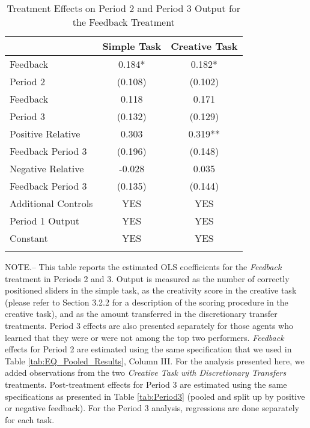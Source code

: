 \begin{table}[h]%
\captionsetup{justification=centering}
\setlength\tabcolsep{2pt}
\caption{Treatment Effects on Period 2 and Period 3 Output for the Feedback Treatment}
\begin{center}%
{\small\renewcommand{\arraystretch}{1}%
\begin{tabular}{lcc}
\hline\noalign{\smallskip}
 & \bf Simple Task & \bf Creative Task \\
\hline\noalign{\smallskip}
\noalign{\smallskip}
Feedback & 0.184* & 0.182* \\
Period 2 & (0.108) & (0.102) \\
\noalign{\smallskip}\hline
\noalign{\smallskip}
Feedback & 0.118 & 0.171 \\
Period 3 & (0.132) & (0.129) \\
\noalign{\smallskip}\hline
\noalign{\smallskip}
Positive Relative & 0.303 & 0.319** \\
Feedback Period 3 & (0.196) & (0.148) \\
\noalign{\smallskip}
Negative Relative & -0.028 & 0.035 \\
Feedback Period 3 & (0.135) & (0.144) \\
\noalign{\smallskip}\hline
\noalign{\smallskip}
 Additional Controls  & YES & YES \\
 Period 1 Output  & YES & YES \\
 Constant & YES & YES \\
\hline\noalign{\medskip}
\end{tabular}
\begin{minipage}{\textwidth} \setlength{\parindent}{15pt}
\footnotesize NOTE.-- This table reports the estimated OLS coefficients for the \textit{Feedback} treatment in Periods 2 and 3. 
Output is measured as the number of correctly positioned sliders in the simple task, as the creativity score in the creative task (please refer to Section 3.2.2 for a description of the scoring procedure in the creative task), and as the amount transferred in the discretionary transfer treatments. 
Period 3 effects are also presented separately for those agents who learned that they were or were not among the top two performers. 
\textit{Feedback} effects for Period 2 are estimated using the same specification that we used in Table \ref{tab:EQ_Pooled_Results}, Column III. 
For the analysis presented here, we added observations from the two \textit{Creative Task with Discretionary Transfers} treatments. 
Post-treatment effects for Period 3 are estimated using the same specifications as presented in Table \ref{tab:Period3} (pooled and split up by positive or negative feedback). 
For the Period 3 analysis, regressions are done separately for each task. 


\end{minipage}}
\end{center}
\end{table}
